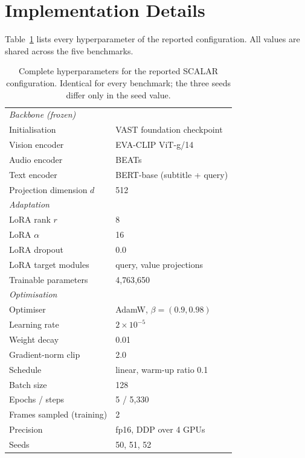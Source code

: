 \documentclass[10pt,twocolumn,letterpaper]{article}
\newcommand{\ours}{SCALAR}
\begin{document}
\section{Implementation Details}
\label{sec:impl}

Table~\ref{tab:hparams} lists every hyperparameter of the reported
configuration. All values are shared across the five benchmarks.

\begin{table}[t]
\centering
\caption{Complete hyperparameters for the reported \ours{} configuration.
Identical for every benchmark; the three seeds differ only in the seed value.}
\label{tab:hparams}
\small
\setlength{\tabcolsep}{4pt}
\begin{tabular}{ll}
\toprule
\multicolumn{2}{l}{\emph{Backbone (frozen)}} \\
Initialisation & VAST foundation checkpoint \\
Vision encoder & EVA-CLIP ViT-g/14 \\
Audio encoder & BEATs \\
Text encoder & BERT-base (subtitle + query) \\
Projection dimension $d$ & 512 \\
\midrule
\multicolumn{2}{l}{\emph{Adaptation}} \\
LoRA rank $r$ & 8 \\
LoRA $\alpha$ & 16 \\
LoRA dropout & 0.0 \\
LoRA target modules & query, value projections \\
Trainable parameters & 4{,}763{,}650 \\
\midrule
\multicolumn{2}{l}{\emph{Optimisation}} \\
Optimiser & AdamW, $\beta=(0.9, 0.98)$ \\
Learning rate & $2\times10^{-5}$ \\
Weight decay & 0.01 \\
Gradient-norm clip & 2.0 \\
Schedule & linear, warm-up ratio 0.1 \\
Batch size & 128 \\
Epochs / steps & 5 / 5{,}330 \\
Frames sampled (training) & 2 \\
Precision & fp16, DDP over 4 GPUs \\
Seeds & 50, 51, 52 \\

\end{tabular}
\end{table}
\end{document}
